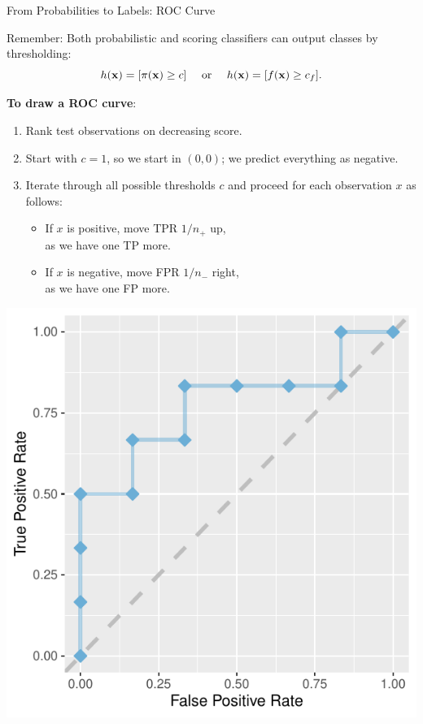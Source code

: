 \documentclass[11pt,compress,t,notes=noshow, xcolor=table]{beamer}
\begin{document}
\begin{vbframe}{From Probabilities to Labels: ROC Curve}

Remember: Both probabilistic and scoring classifiers can output classes by
thresholding:
$$h(\mathbf{x}) = [\pi(\mathbf{x}) \ge c] \quad \text{ or } \quad h(\mathbf{x}) = [f(\mathbf{x}) \ge c_f].$$


\textbf{To draw a ROC curve}:

\lz

\begin{minipage}[b]{0.65\textwidth}
  \footnotesize
  \begin{enumerate}
    \item Rank test observations on decreasing score.
    \item Start with $c = 1$, so we start in $(0, 0)$; we predict everything as
    negative.
    \item Iterate through all possible thresholds $c$ and proceed for each
    observation $x$ as follows:
    \begin{itemize}
      \footnotesize
      \item If $x$ is positive, move TPR $1/n_+$ up, \\as we have one TP more.
      \item If $x$ is negative, move FPR $1/n_-$ right, \\as we have one FP
      more.
    \end{itemize}
  \end{enumerate}
\end{minipage}%
\begin{minipage}[b]{0.35\textwidth}
  \centering
  \includegraphics[width=\textwidth]{figure/eval_mclass_roc_sp_4}
\end{minipage}

\end{vbframe}
\end{document}
